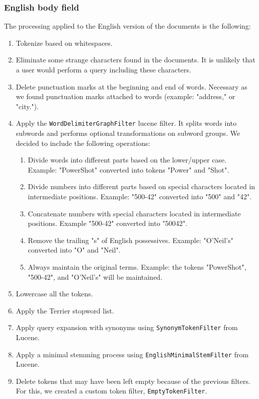 \subsubsection{English body field}
The processing applied to the English version of the documents is the following:
\begin{enumerate}
    \item Tokenize based on whitespaces.
    \item Eliminate some strange characters found in the documents.
    It is unlikely that a user would perform a query including these characters.
    \item Delete punctuation marks at the beginning and end of words.
    Necessary as we found punctuation marks attached to words (example: "address," or "city.").
    \item Apply the \texttt{WordDelimiterGraphFilter} lucene filter.
    It splits words into subwords and performs optional transformations on subword groups.
    We decided to include the following operations:
    \begin{enumerate}
        \item Divide words into different parts based on the lower/upper case.
        Example: "PowerShot" converted into tokens "Power" and "Shot".
        \item Divide numbers into different parts based on special characters located in intermediate positions.
        Example: "500-42" converted into "500" and "42".
        \item Concatenate numbers with special characters located in intermediate positions.
        Example "500-42" converted into "50042".
        \item Remove the trailing "s" of English possessives.
        Example: "O'Neil's" converted into "O" and "Neil".
        \item Always maintain the original terms.
        Example: the tokens "PowerShot", "500-42", and "O'Neil's" will be maintained.
    \end{enumerate}
    \item Lowercase all the tokens.
    \item Apply the Terrier stopword list. %
    \item Apply query expansion with synonyms using \texttt{SynonymTokenFilter} from Lucene. %
    \item Apply a minimal stemming process using \texttt{EnglishMinimalStemFilter} from Lucene.
    \item Delete tokens that may have been left empty because of the previous filters.
    For this, we created a custom token filter, \texttt{EmptyTokenFilter}.
\end{enumerate}

